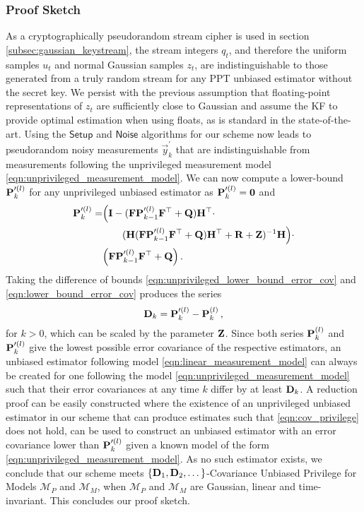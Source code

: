 \documentclass[letterpaper, 10 pt, conference]{IEEEtran}
\theoremstyle{definition}
\begin{document}
\subsubsection{Proof Sketch}
As a cryptographically pseudorandom stream cipher is used in section \ref{subsec:gaussian_keystream}, the stream integers $q_t$, and therefore the uniform samples $u_t$ and normal Gaussian samples $z_t$, are indistinguishable to those generated from a truly random stream for any PPT unbiased estimator without the secret key. We persist with the previous assumption that floating-point representations of $z_t$ are sufficiently close to Gaussian and assume the KF to provide optimal estimation when using floats, as is standard in the state-of-the-art. Using the $\mathsf{Setup}$ and $\mathsf{Noise}$ algorithms for our scheme now leads to pseudorandom noisy measurements $\vec{y}^\prime_k$ that are indistinguishable from measurements following the unprivileged measurement model \eqref{eqn:unprivileged_measurement_model}. We can now compute a lower-bound ${{\mathbf{P}}}_k^{\prime(l)}$ for any unprivileged unbiased estimator as ${{\mathbf{P}}}_k^{\prime(l)}={{\mathbf{0}}}$ and
\begin{equation}\label{eqn:unprivileged_lower_bound_error_cov}
   \begin{split}
      \mat{P}_k^{\prime(l)} =& \Bigl( \mat{I} - (\mat{F}\mat{P}_{k-1}^{\prime(l)}\mat{F}^\top + \mat{Q})\mat{H}^\top \cdot \\
      &\qquad(\mat{H}(\mat{F}\mat{P}_{k-1}^{\prime(l)}\mat{F}^\top + \mat{Q})\mat{H}^\top + \mat{R}+\mat{Z})^{-1}\mat{H}\Bigr)\cdot\\
      &\Bigl(\mat{F}\mat{P}_{k-1}^{\prime(l)}\mat{F}^\top + \mat{Q}\Bigr)\,.
   \end{split}
\end{equation}
Taking the difference of bounds \eqref{eqn:unprivileged_lower_bound_error_cov} and \eqref{eqn:lower_bound_error_cov} produces the series
\begin{equation}\label{eqn:covariance_difference_series}
   \mat{D}_k = \mat{P}_k^{\prime(l)} - \mat{P}_k^{(l)}\,,
\end{equation}
for $k>0$, which can be scaled by the parameter ${{\mathbf{Z}}}$. Since both series ${{\mathbf{P}}}_k^{(l)}$ and ${{\mathbf{P}}}_k^{\prime(l)}$ give the lowest possible error covariance of the respective estimators, an unbiased estimator following model \eqref{eqn:linear_measurement_model} can always be created for one following the model \eqref{eqn:unprivileged_measurement_model} such that their error covariances at any time $k$ differ by at least ${{\mathbf{D}}}_k$. A reduction proof can be easily constructed where the existence of an unprivileged unbiased estimator in our scheme that can produce estimates such that \eqref{eqn:cov_privilege} does not hold, can be used to construct an unbiased estimator with an error covariance lower than ${{\mathbf{P}}}_k^{\prime(l)}$ given a known model of the form \eqref{eqn:unprivileged_measurement_model}. As no such estimator exists, we conclude that our scheme meets $\{{{\mathbf{D}}}_1,{{\mathbf{D}}}_2,\dots\}$-Covariance Unbiased Privilege for Models $\mathcal{M}_P$ and $\mathcal{M}_M$, when $\mathcal{M}_P$ and $\mathcal{M}_M$ are Gaussian, linear and time-invariant. This concludes our proof sketch.
\end{document}
